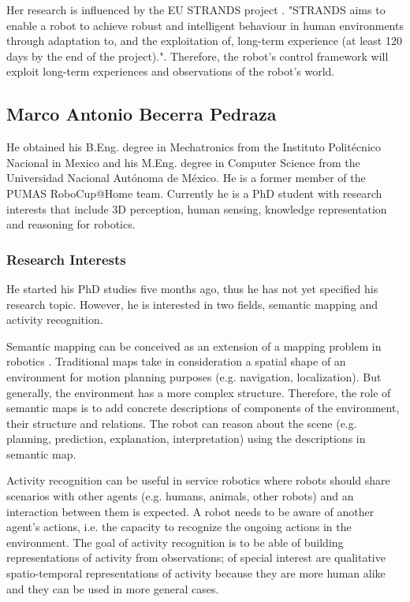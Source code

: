 \documentclass[conference]{IEEEtran}
\begin{document}
Her research is influenced %
 by the EU STRANDS project \cite{strands}. "STRANDS aims to enable a robot to achieve robust and intelligent behaviour in human environments through adaptation to, and the exploitation of, long-term experience (at least 120 days by the end of the project).". Therefore, the robot's control framework will exploit long-term experiences and observations of the robot's world. 

\subsection{Marco Antonio Becerra Pedraza}

He obtained his B.Eng. degree in Mechatronics from the Instituto Politécnico Nacional in Mexico and his M.Eng. degree in Computer Science from the Universidad Nacional Autónoma de México. He is a former member of the PUMAS RoboCup@Home team. Currently he is a PhD student with research interests that include 3D perception, human sensing, knowledge representation and reasoning for robotics.

\subsubsection*{Research Interests}

He started his PhD studies five months ago, thus he has not yet specified his research topic. However, he is interested in two fields, semantic mapping and activity recognition.

Semantic mapping can be conceived as an extension of a mapping problem in robotics \cite{Nuchter08_TowardsSemanticMaps}. Traditional maps take in consideration a spatial shape of an environment for motion planning purposes (e.g. navigation, localization). But generally, the environment has a more complex structure. Therefore, the role of semantic maps is to add concrete descriptions of components of the environment, their structure and relations. The robot can reason about the scene (e.g. planning, prediction, explanation, interpretation) using the descriptions in semantic map.

Activity recognition can be useful in service robotics where robots should share scenarios %
with other agents (e.g. humans, animals, other robots) and an interaction between them is expected. A robot needs to be aware of another agent's actions, i.e. the capacity to recognize the ongoing actions in the environment. The goal of activity recognition is to be able of building representations of activity from observations; of special interest are qualitative spatio-temporal representations of activity because they are more human alike and they can be used in more general cases.
\end{document}
